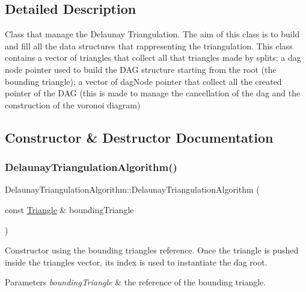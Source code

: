 \subsection{Detailed Description}
Class that manage the Delaunay Triangulation. The aim of this class is to build and fill all the data structures that rappresenting the triangulation. This class contains a vector of triangles that collect all that triangles made by splits; a dag node pointer used to build the D\+AG structure starting from the root (the bounding triangle); a vector of dag\+Node pointer that collect all the created pointer of the D\+AG (this is made to manage the cancellation of the dag and the construction of the voronoi diagram) 

\subsection{Constructor \& Destructor Documentation}
\mbox{\label{classDelaunayTriangulationAlgorithm_a91aee656e92987fafbadd7c43f2de179}} 
\subsubsection{\texorpdfstring{Delaunay\+Triangulation\+Algorithm()}{DelaunayTriangulationAlgorithm()}}
{\footnotesize\ttfamily Delaunay\+Triangulation\+Algorithm\+::\+Delaunay\+Triangulation\+Algorithm (\begin{DoxyParamCaption}\item[{const \hyperlink{classTriangle}{Triangle} \&}]{bounding\+Triangle }\end{DoxyParamCaption})\hspace{0.3cm}{\ttfamily [inline]}}



Constructor using the bounding triangle\textquotesingle{}s reference. Once the triangle is pushed inside the triangles vector, its index is used to instantiate the dag root. 


\begin{DoxyParams}{Parameters}
{\em bounding\+Triangle} & the reference of the bounding triangle. \\
\hline
\end{DoxyParams}


